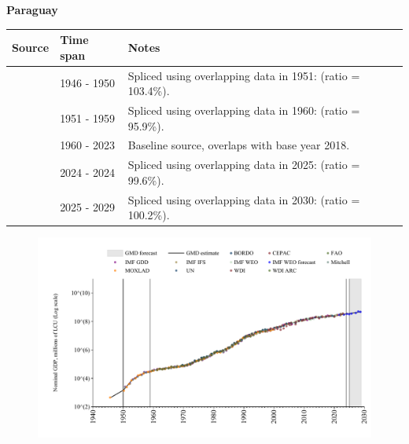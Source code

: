 \documentclass[12pt,a4paper,landscape]{article}
\begin{document}
\begin{adjustbox}{max totalsize={\paperwidth}{\paperheight},center}
\begin{minipage}[t][\textheight][t]{\textwidth}
\vspace*{0.5cm}
{}
\begin{center}
{\Large\bfseries Paraguay}
\end{center}
\vspace{0.5cm}
\begin{table}[H]
\centering
\small
\begin{tabular}{|l|l|l|}
\hline
\textbf{Source} & \textbf{Time span} & \textbf{Notes} \\
\hline
\rowcolor{white}\cite{MOXLAD}& 1946 - 1950 &Spliced using overlapping data in 1951: (ratio = 103.4\%).\\
\rowcolor{lightgray}\cite{IMF_GDD}& 1951 - 1959 &Spliced using overlapping data in 1960: (ratio = 95.9\%).\\
\rowcolor{white}\cite{WDI}& 1960 - 2023 &Baseline source, overlaps with base year 2018.\\
\rowcolor{lightgray}\cite{IMF_IFS}& 2024 - 2024 &Spliced using overlapping data in 2025: (ratio = 99.6\%).\\
\rowcolor{white}\cite{IMF_WEO_forecast}& 2025 - 2029 &Spliced using overlapping data in 2030: (ratio = 100.2\%).\\
\hline
\end{tabular}
\end{table}
\begin{figure}[H]
\centering
\includegraphics[width=\textwidth,height=0.6\textheight,keepaspectratio]{graphs/PRY_nGDP.pdf}
\end{figure}
\end{minipage}
\end{adjustbox}
\end{document}
